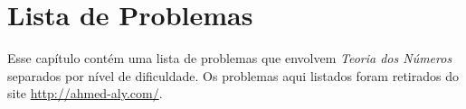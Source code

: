 
\chapter{Lista de Problemas} %

\label{Chapter4} %


Esse capítulo contém uma lista de problemas que envolvem \textit{Teoria dos Números}
separados por nível de dificuldade. Os problemas aqui listados foram retirados do site
\href{http://ahmed-aly.com/Category.jsp?ID=41}{http://ahmed-aly.com/}.
\\

